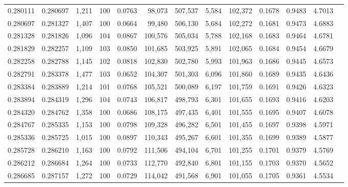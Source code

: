\begin{tabular}{rrrrrrrrrrrrr}
0.280111 & 0.280697 & 1,211 & 100 &                                     0.0763 &  98,073 & 507,537 &   5,584 & 102,372 & 0.1678 & 0.9483 & 4.7013 \\
0.280697 & 0.281327 & 1,407 & 100 &                                     0.0664 &  99,480 & 506,130 &   5,684 & 102,272 & 0.1681 & 0.9473 & 4.6883 \\
0.281328 & 0.281826 & 1,096 & 104 &                                     0.0867 & 100,576 & 505,034 &   5,788 & 102,168 & 0.1683 & 0.9464 & 4.6781 \\
0.281829 & 0.282257 & 1,109 & 103 &                                     0.0850 & 101,685 & 503,925 &   5,891 & 102,065 & 0.1684 & 0.9454 & 4.6679 \\
0.282258 & 0.282788 & 1,145 & 102 &                                     0.0818 & 102,830 & 502,780 &   5,993 & 101,963 & 0.1686 & 0.9445 & 4.6573 \\
0.282791 & 0.283378 & 1,477 & 103 &                                     0.0652 & 104,307 & 501,303 &   6,096 & 101,860 & 0.1689 & 0.9435 & 4.6436 \\
0.283384 & 0.283889 & 1,214 & 101 &                                     0.0768 & 105,521 & 500,089 &   6,197 & 101,759 & 0.1691 & 0.9426 & 4.6323 \\
0.283894 & 0.284319 & 1,296 & 104 &                                     0.0743 & 106,817 & 498,793 &   6,301 & 101,655 & 0.1693 & 0.9416 & 4.6203 \\
0.284320 & 0.284762 & 1,358 & 100 &                                     0.0686 & 108,175 & 497,435 &   6,401 & 101,555 & 0.1695 & 0.9407 & 4.6078 \\
0.284767 & 0.285335 & 1,153 & 100 &                                     0.0798 & 109,328 & 496,282 &   6,501 & 101,455 & 0.1697 & 0.9398 & 4.5971 \\
0.285336 & 0.285725 & 1,015 & 100 &                                     0.0897 & 110,343 & 495,267 &   6,601 & 101,355 & 0.1699 & 0.9389 & 4.5877 \\
0.285728 & 0.286210 & 1,163 & 100 &                                     0.0792 & 111,506 & 494,104 &   6,701 & 101,255 & 0.1701 & 0.9379 & 4.5769 \\
0.286212 & 0.286684 & 1,264 & 100 &                                     0.0733 & 112,770 & 492,840 &   6,801 & 101,155 & 0.1703 & 0.9370 & 4.5652 \\
0.286685 & 0.287157 & 1,272 & 100 &                                     0.0729 & 114,042 & 491,568 &   6,901 & 101,055 & 0.1705 & 0.9361 & 4.5534 \\

\end{tabular}
